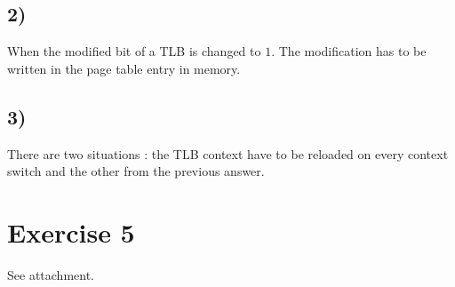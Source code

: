 \documentclass[a4paper,11pt]{report}
\begin{document}
\subsection*{2)}

When the modified bit of a TLB is changed to $1$. The modification has to be
written in the page table entry in memory.

\subsection*{3)}

There are two situations : the TLB context have to be reloaded on every context
switch and the other from the previous answer.

\section*{Exercise 5}

See attachment.
\end{document}
